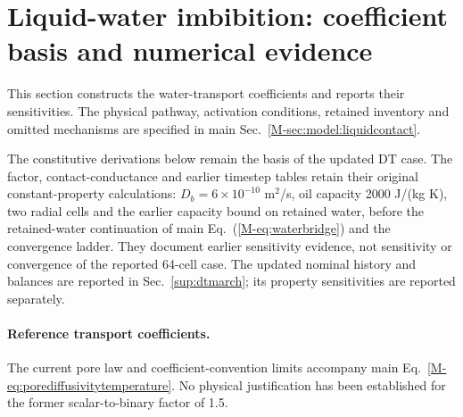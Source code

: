 \section{Liquid-water imbibition: coefficient basis and numerical evidence}
\label{sup:finitecontact}
This section constructs the water-transport coefficients and reports
their sensitivities. The physical pathway, activation conditions, retained
inventory and omitted mechanisms are specified in main
Sec.~\ref*{M-sec:model:liquidcontact}.

The constitutive derivations below remain the basis of the updated DT case.
The factor, contact-conductance and earlier timestep tables retain their
original constant-property calculations: $D_b=6\times10^{-10}$ m$^2$/s,
oil capacity 2000 J/(kg K), two radial cells and the earlier capacity
bound on retained water, before the retained-water continuation of main
Eq.~(\ref*{M-eq:waterbridge}) and the convergence ladder. They document
earlier sensitivity evidence, not sensitivity or convergence of the
reported 64-cell case.
The updated nominal history and balances are reported in
Sec.~\ref{sup:dtmarch}; its property sensitivities are reported separately.

\paragraph{Reference transport coefficients.}
\label{sup:watermobility}
The current pore law and coefficient-convention limits accompany main
Eq.~\ref*{M-eq:porediffusivitytemperature}. No physical justification has
been established for the former scalar-to-binary factor of 1.5.

